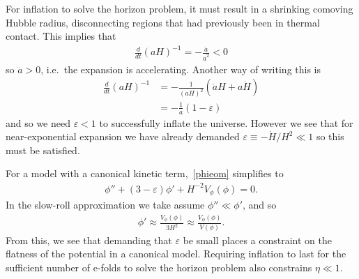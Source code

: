     For inflation to solve the horizon problem, it must result in a shrinking comoving
    Hubble radius, disconnecting regions that had previously been in thermal contact.
    This implies that
    \begin{align}
        \frac{d}{dt}\left(aH\right)^{-1} = -\frac{\ddot{a}}{\dot{a}^2} < 0
    \end{align}
    so $\ddot{a}>0$, i.e.\ the expansion is accelerating. Another way of writing this is
    \begin{align}
        \frac{d}{dt}\left(aH\right)^{-1} &= -\frac{1}{(aH)^2}\left(\dot{a}H+a\dot{H}\right)\\
            &= -\frac{1}{a}\left(1-\varepsilon\right)
    \end{align}
    and so we need $\varepsilon<1$ to successfully inflate the universe.
    However we see that for near-exponential expansion we have already demanded
    $\varepsilon\equiv-\dot{H}/H^2\ll1$ so this must be satisfied.


For a model with a canonical kinetic term,~\eqref{phieom} simplifies
to
\begin{align}
    \phi''+(3-\varepsilon)\phi'+H^{-2}V_{\phi}(\phi)=0.
\end{align}
In the slow-roll approximation we take assume $\phi''\ll\phi'$,
and so
\begin{align}
    \phi'\approx\frac{V_{\phi}(\phi)}{3H^2}\approx\frac{V_{\phi}(\phi)}{V(\phi)}.
\end{align}
From this, we see that demanding that $\varepsilon$ be small places a constraint
on the flatness of the potential in a canonical model.
Requiring inflation to last for the sufficient number
of e-folds to solve the horizon problem
also constrains $\eta\ll1$.




